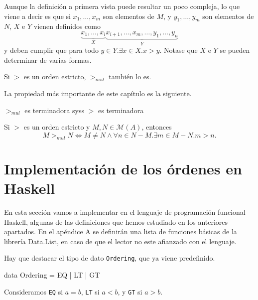 Aunque la definición a primera vista puede resultar un poco compleja, lo que
viene a decir es que si $x_1, \dots, x_m$ son elementos de $M$, y
$y_1, \dots, y_m$ son elementos de $N$, $X$ e $Y$ vienen definidos como
\[ \underbrace{x_1, \dots, x_i}_{X} 
   \underbrace{x_{i+1}, \dots, x_m, \dots, y_1, \dots, y_n}_{Y} \] 
y deben cumplir que para todo $y \in Y. \exists x \in X. x>y$. Notase que $X$
e $Y$ se pueden determinar de varias formas.

\begin{lema}
  Si $>$ es un orden estricto, $>_{mul}$ también lo es.
\end{lema}

La propiedad más importante de este capítulo es la siguiente.

\begin{teor}
  $>_{mul}$ es terminadora syss $>$ es terminadora
\end{teor}

\begin{lema}\label{lemordsyss}
  Si $>$ es un orden estricto y $M,N \in \mathcal{M}(A)$, entonces
  \[ M >_{mul} N\Leftrightarrow M \neq N \wedge 
    \forall n \in N - M. \exists m \in M - N. m > n. \]
\end{lema}


\section{Implementación de los órdenes en Haskell}

En esta sección vamos a implementar en el lenguaje de programación
funcional Haskell, algunas de las definiciones que hemos estudiado en
los anteriores apartados. En el apéndice A se definirán una lista de
funciones básicas de la librería Data.List, en caso de que el lector
no este afianzado con el lenguaje.

Hay que destacar el tipo de dato \texttt{Ordering}, que ya viene predefinido.

\begin{preludio}
data Ordering = EQ | LT | GT
\end{preludio}

Consideramos \texttt{EQ} si $a = b$, \texttt{LT} si $a < b $, y
\texttt{GT} si $a > b$.


